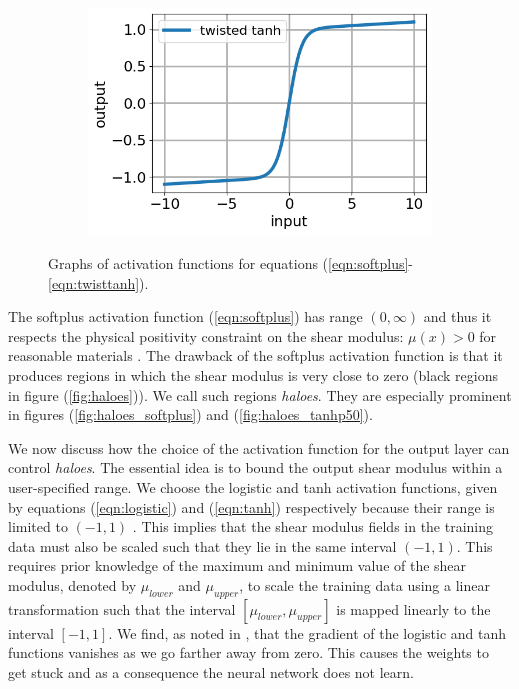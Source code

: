 \documentclass[12pt]{article}
\newcommand{\nhgactfuncheight}{3.5cm}
\newcommand{\nhgactfuncwidth}{0.48\linewidth}
\begin{document}
\begin{figure}[!h]
\begin{subfigure}[t]{\nhgactfuncwidth}
  \end{subfigure}
  \begin{subfigure}[t]{\nhgactfuncwidth}
    \centering
    \includegraphics[totalheight=\nhgactfuncheight]{Figures/actfuncs/twistedtanh.png}
  \end{subfigure}
\caption{\label{fig:activations} Graphs of activation functions for equations (\ref{eqn:softplus}-\ref{eqn:twisttanh}).}
\end{figure}
%

The softplus activation function (\ref{eqn:softplus}) has range $(0,\infty)$ and thus it respects the physical positivity constraint on the shear modulus: $\mu(x)>0$ for reasonable materials \cite{book:segelmathcont}. The drawback of the softplus activation function is that it produces regions in which the shear modulus is very close to zero (black regions in figure (\ref{fig:haloes})). We call such regions \textit{haloes}. They are especially prominent in figures (\ref{fig:haloes_softplus}) and (\ref{fig:haloes_tanhp50}).

We now discuss how the choice of the activation function for the output layer can control \textit{haloes}. The essential idea is to bound the output shear modulus within a user-specified range. We choose the logistic and tanh activation functions, given by equations (\ref{eqn:logistic}) and (\ref{eqn:tanh}) respectively because their range is limited to $(-1,1)$ . This implies that the shear modulus fields in the training data must also be scaled such that they lie in the same interval $(-1,1)$. This requires prior knowledge of the maximum and minimum value of the shear modulus, denoted by $\mu_{lower}$ and $\mu_{upper}$, to scale the training data using a linear transformation such that the interval $[\mu_{lower},\mu_{upper}]$ is mapped linearly to the interval $[-1,1]$. We find, as noted in \cite{bookchap:lecun98b}, that the gradient of the logistic and tanh functions vanishes as we go farther away from zero. This causes the weights to get stuck and as a consequence the neural network does not learn.
\end{document}
